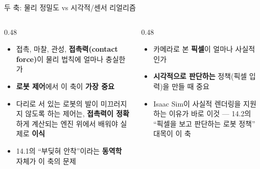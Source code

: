 \begin{frame}{두 축: 물리 정밀도 vs 시각적/센서 리얼리즘}
  \begin{columns}[T]
    \begin{column}{0.48\textwidth}
      \begin{itemize}
        \item 접촉, 마찰, 관성, \textbf{접촉력(contact force)}이
          물리 법칙에 얼마나 충실한가
        \item \textbf{로봇 제어}에서 이 축이 \textbf{가장 중요}
        \item 다리로 서 있는 로봇의 발이 미끄러지지 않도록 하는
          제어는, \textbf{접촉력이 정확}하게 계산되는 엔진 위에서
          배워야 실제로 \textbf{이식}
        \item 14.1의 ``부딪혀 안착''이라는 \textbf{동역학} 자체가
          이 축의 문제
      \end{itemize}
    \end{column}
    \begin{column}{0.48\textwidth}
      \begin{itemize}
        \item 카메라로 본 \textbf{픽셀}이 얼마나 사실적인가
        \item \textbf{시각적으로 판단하는} 정책(픽셀 입력)을 만들
          때 중요
        \item Isaac Sim이 사실적 렌더링을 지원하는 이유가 바로
          이것 --- 14.2의 ``픽셀을 보고 판단하는 로봇 정책''
          대목이 이 축
      \end{itemize}
    \end{column}
  \end{columns}
\end{frame}
